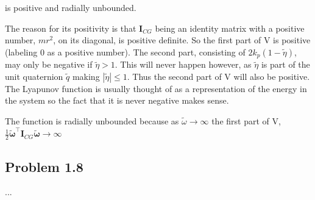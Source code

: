 is positive and radially unbounded. 

The reason for its positivity is that $\mathbf{I}_{CG}$ being an identity matrix with a positive number, $mr^2$, on its diagonal, is positive definite. So the first part of V is positive (labeling 0 as a positive number). The second part, consisting of $2 k_p (1-\tilde{\eta})$, may only be negative if $\tilde{\eta} > 1$. This will never happen however, as $\tilde{\eta}$ is part of the unit quaternion $\tilde{q}$ making $|\tilde{\eta}| \leq 1$. Thus the second part of V will also be positive. The Lyapunov function is usually thought of as a representation of the energy in the system so the fact that it is never negative makes sense. 

The function is radially unbounded because as $\tilde{\omega}\rightarrow \infty$ the first part of V, $\frac{1}{2} \tilde{\boldsymbol{\omega}}^{\top} \mathbf{I}_{CG}\tilde{\boldsymbol{\omega}} \rightarrow \infty$

\subsection*{Problem 1.8}
...


